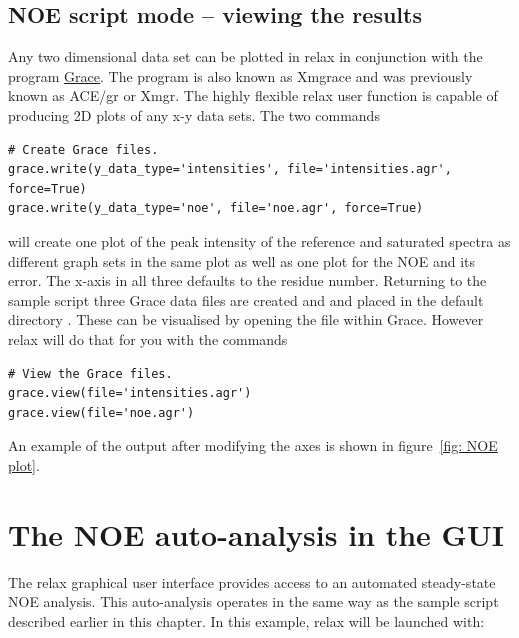 \subsection{NOE script mode -- viewing the results}

Any two dimensional data set can be plotted in relax in conjunction with the program \href{http://plasma-gate.weizmann.ac.il/Grace/}{Grace}.
The program is also known as Xmgrace and was previously known as ACE/gr or Xmgr.
The highly flexible relax user function  is capable of producing 2D plots of any x-y data sets.
The two commands

\begin{lstlisting}[firstnumber=41]
# Create Grace files.
grace.write(y_data_type='intensities', file='intensities.agr', force=True)
grace.write(y_data_type='noe', file='noe.agr', force=True)
\end{lstlisting}

will create one plot of the peak intensity of the reference and saturated spectra as different graph sets in the same plot as well as one plot for the NOE and its error.
The x-axis in all three defaults to the residue number.
Returning to the sample script three Grace data files are created  and  and placed in the default directory .
These can be visualised by opening the file within Grace.
However relax will do that for you with the commands

\begin{lstlisting}[firstnumber=45]
# View the Grace files.
grace.view(file='intensities.agr')
grace.view(file='noe.agr')
\end{lstlisting}

An example of the output after modifying the axes is shown in figure~\ref{fig: NOE plot}.



\newpage
\section{The NOE auto-analysis in the GUI}

The relax graphical user interface provides access to an automated steady-state NOE analysis.
This auto-analysis operates in the same way as the sample script described earlier in this chapter.
In this example, relax will be launched with:


